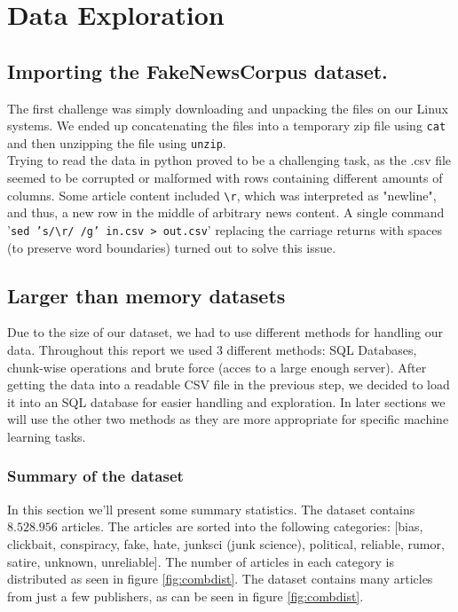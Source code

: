 \section{Data Exploration}

\subsection{Importing the FakeNewsCorpus dataset.}
The first challenge was simply downloading and unpacking the files on our Linux systems. We ended up concatenating the
files into a temporary zip file using \texttt{cat} and then unzipping the file using \texttt{unzip}. \\

Trying to read the data in python proved to be a challenging task, as the .csv file seemed to be corrupted or malformed with rows containing different amounts of columns. Some article content included \texttt{\textbackslash r}, which was interpreted as "newline", and thus, a new row in the middle of arbitrary news content. A single command '\texttt{sed 's/\textbackslash r/ /g' in.csv > out.csv}' replacing the carriage returns with spaces (to preserve word boundaries) turned out to solve this issue.\\

\subsection{Larger than memory datasets}
Due to the size of our dataset, we had to use different methods for handling our data. Throughout this report we used 3 different methods: SQL Databases, chunk-wise operations and brute force (acces
to a large enough server). After getting the data into a readable CSV file in the previous step, we decided to load it
into an SQL database for easier handling and exploration. In later sections we will use the other two methods as they
are more appropriate for specific machine learning tasks.


\subsubsection{Summary of the dataset}
In this section we'll present some summary statistics. The dataset contains $ 8.528.956 $ articles. The articles are
sorted into the following categories: [bias, clickbait, conspiracy, fake, hate, junksci (junk science), political,
reliable, rumor, satire, unknown, unreliable]. The number of articles in each category is distributed as seen in figure
\ref{fig:combdist}. The dataset contains many articles from just a few publishers, as can be seen in figure \ref{fig:combdist}.

